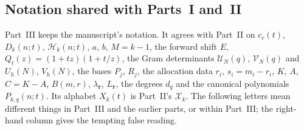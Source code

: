 \documentclass[11pt]{article}
\theoremstyle{definition}
\theoremstyle{remark}
\newcommand{\Ht}{\mathcal H}
\newcommand{\XX}{\mathcal X}
\theoremstyle{definition}
\theoremstyle{plain}
\numberwithin{equation}{section}
\begin{document}
\subsection{Notation shared with Parts~I and~II}
\label{cp:sec:notation}
Part~III keeps the manuscript's notation. It agrees with Part~II on
$c_r(t)$, $D_k(n;t)$, $\Ht_k(n;t)$, $a$, $b$, $M=k-1$, the forward shift
$E$, $Q_t(z)=(1+tz)(1+t/z)$, the Gram determinants $\mathcal U_N(q)$,
$\mathcal V_N(q)$ and $U_h(N)$, $V_h(N)$, the bases $P_j$, $R_j$, the
allocation data $r_i$, $s_i=m_i-r_i$, $K$, $A$, $C=K-A$, $B(m,r)$,
$\lambda_{\boldsymbol r}$, $L_{\boldsymbol r}$, the degrees $d_q$ and the
canonical polynomials $P_{k,q}(n;t)$. Its alphabet $X_k(t)$ is Part~II's
$\XX_k$. The following letters mean different things in Part~III and the
earlier parts, or within Part~III; the right-hand column gives the tempting
false reading.
\end{document}
